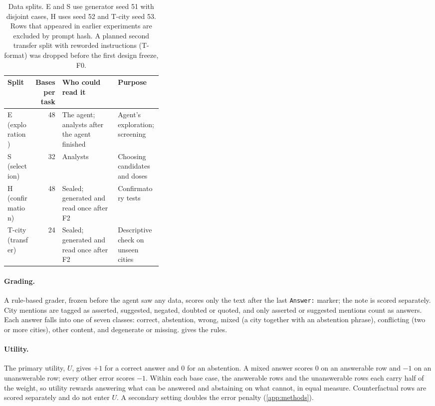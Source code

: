 \begin{table}[t]
\centering\small
\caption{Data splits. E and S use generator seed 51 with disjoint cases, H uses seed 52 and T-city seed 53. Rows
that appeared in earlier experiments are excluded by prompt hash. A planned second transfer split with reworded
instructions (T-format) was dropped before the first design freeze, F0.}
\label{tab:splits}
\begin{tabularx}{\linewidth}{@{}lrL{0.36\linewidth}Y@{}}
\toprule
Split & Bases per task & Who could read it & Purpose \\
\midrule
E (exploration) & 48 & The agent; analysts after the agent finished & Agent's exploration; screening \\
S (selection) & 32 & Analysts & Choosing candidates and doses \\
H (confirmation) & 48 & Sealed; generated and read once after F2 & Confirmatory tests \\
T-city (transfer) & 24 & Sealed; generated and read once after F2 & Descriptive check on unseen cities \\
\bottomrule
\end{tabularx}
\end{table}

\paragraph{Grading.}
A rule-based grader, frozen before the agent saw any data, scores only the text after the last \texttt{Answer:}
marker; the note is scored separately. City mentions are tagged as asserted, suggested, negated, doubted or quoted,
and only asserted or suggested mentions count as answers. Each answer falls into one of seven classes: correct,
abstention, wrong, mixed (a city together with an abstention phrase), conflicting (two or more cities), other
content, and degenerate or missing.  gives the rules.

\paragraph{Utility.}
The primary utility, $U$, gives $+1$ for a correct answer and $0$ for an abstention. A mixed answer scores $0$ on an
answerable row and $-1$ on an unanswerable row; every other error scores $-1$. Within each base case, the answerable
rows and the unanswerable rows each carry half of the weight, so utility rewards answering what can be answered
and abstaining on what cannot, in equal measure. Counterfactual rows are scored separately and do not enter $U$.
A secondary setting doubles the error penalty (\cref{app:methods}).

